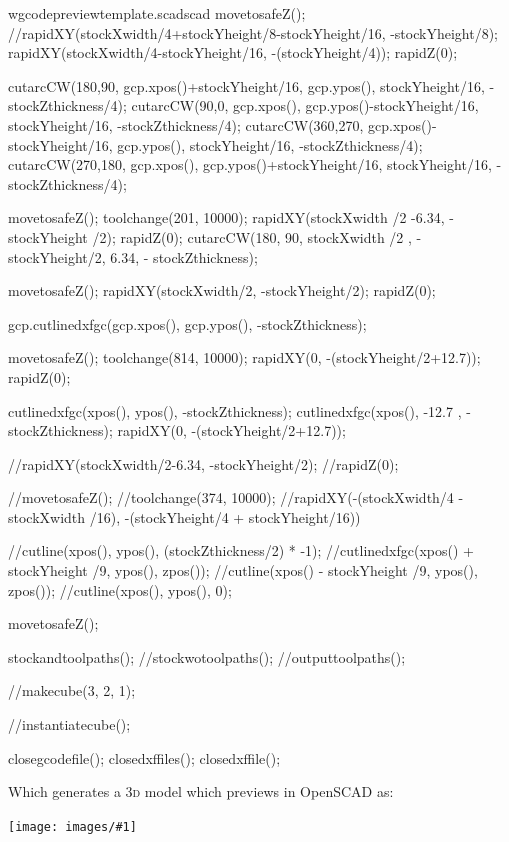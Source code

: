 \documentclass{ltxdoc}
\newcommand{\includeimage}[1]{\bigskip\noindent\texttt{[image: images/\#1]}\bigskip}
\begin{document}
\begin{writecode}{w}{gcodepreviewtemplate.scad}{scad}
movetosafeZ();
//rapidXY(stockXwidth/4+stockYheight/8-stockYheight/16, -stockYheight/8);
rapidXY(stockXwidth/4-stockYheight/16, -(stockYheight/4));
rapidZ(0);

cutarcCW(180,90, gcp.xpos()+stockYheight/16, gcp.ypos(), stockYheight/16, -stockZthickness/4);
cutarcCW(90,0, gcp.xpos(), gcp.ypos()-stockYheight/16, stockYheight/16, -stockZthickness/4);
cutarcCW(360,270, gcp.xpos()-stockYheight/16, gcp.ypos(), stockYheight/16, -stockZthickness/4);
cutarcCW(270,180, gcp.xpos(), gcp.ypos()+stockYheight/16, stockYheight/16, -stockZthickness/4);

movetosafeZ();
toolchange(201, 10000);
rapidXY(stockXwidth /2 -6.34, - stockYheight /2);
rapidZ(0);
cutarcCW(180, 90, stockXwidth /2 , -stockYheight/2, 6.34, - stockZthickness);

movetosafeZ();
rapidXY(stockXwidth/2, -stockYheight/2);
rapidZ(0);

gcp.cutlinedxfgc(gcp.xpos(), gcp.ypos(), -stockZthickness);

movetosafeZ();
toolchange(814, 10000);
rapidXY(0, -(stockYheight/2+12.7));
rapidZ(0);

cutlinedxfgc(xpos(), ypos(), -stockZthickness);
cutlinedxfgc(xpos(), -12.7 , -stockZthickness);
rapidXY(0, -(stockYheight/2+12.7));

//rapidXY(stockXwidth/2-6.34, -stockYheight/2);
//rapidZ(0);

//movetosafeZ();
//toolchange(374, 10000);
//rapidXY(-(stockXwidth/4 - stockXwidth /16), -(stockYheight/4 + stockYheight/16))

//cutline(xpos(), ypos(), (stockZthickness/2) * -1);
//cutlinedxfgc(xpos() + stockYheight /9, ypos(), zpos());
//cutline(xpos() - stockYheight /9, ypos(), zpos());
//cutline(xpos(), ypos(), 0);

movetosafeZ();

stockandtoolpaths();
//stockwotoolpaths();
//outputtoolpaths();

//makecube(3, 2, 1);

//instantiatecube();

closegcodefile();
closedxffiles();
closedxffile();

\end{writecode}
\addtocounter{gcptmpl}{131}


\begin{samepage}
\noindent Which generates a \textsc{3d} model which previews in OpenSCAD as:

\bigskip

\includeimage{gcodepreview_unittests_scad.png}
\end{samepage}
\end{document}
